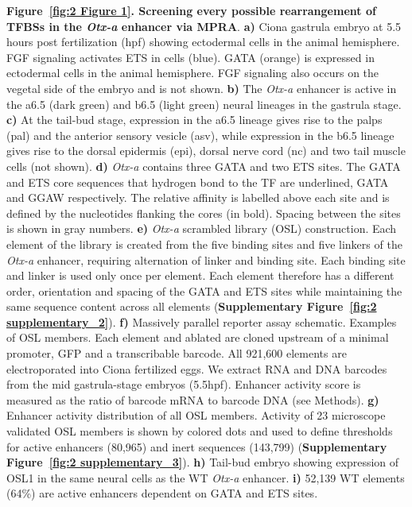 \thispagestyle{plain}
\noindent
\textbf{Figure~\ref{fig:2 Figure 1}. Screening every possible rearrangement of TFBSs in the \textit{Otx-a} enhancer via MPRA}. \textbf{a)} Ciona gastrula embryo at 5.5 hours post fertilization (hpf) showing ectodermal cells in the animal hemisphere. FGF signaling activates ETS in cells (blue). GATA (orange) is expressed in ectodermal cells in the animal hemisphere. FGF signaling also occurs on the vegetal side of the embryo and is not shown. \textbf{b)} The \textit{Otx-a} enhancer is active in the a6.5 (dark green) and b6.5 (light green) neural lineages in the gastrula stage. \textbf{c)} At the tail-bud stage, expression in the a6.5 lineage gives rise to the palps (pal) and the anterior sensory vesicle (asv), while expression in the b6.5 lineage gives rise to the dorsal epidermis (epi), dorsal nerve cord (nc) and two tail muscle cells (not shown). \textbf{d)} \textit{Otx-a} contains three GATA and two ETS sites. The GATA and ETS core sequences that hydrogen bond to the TF are underlined, GATA and GGAW respectively. The relative affinity is labelled above each site and is defined by the nucleotides flanking the cores (in bold). Spacing between the sites is shown in gray numbers. \textbf{e)} \textit{Otx-a} scrambled library (OSL) construction. Each element of the library is created from the five binding sites and five linkers of the \textit{Otx-a} enhancer, requiring alternation of linker and binding site. Each binding site and linker is used only once per element. Each element therefore has a different order, orientation and spacing of the GATA and ETS sites while maintaining the same sequence content across all elements (\textbf{Supplementary Figure~\ref{fig:2 supplementary_2}}). \textbf{f)} Massively parallel reporter assay schematic. Examples of OSL members. Each element and ablated are cloned upstream of a minimal promoter, GFP and a transcribable barcode. All 921,600 elements are electroporated into Ciona fertilized eggs. We extract RNA and DNA barcodes from the mid gastrula-stage embryos (5.5hpf). Enhancer activity score is measured as the ratio of barcode mRNA to barcode DNA (see Methods). \textbf{g)} Enhancer activity distribution of all OSL members. Activity of 23 microscope validated OSL members is shown by colored dots and used to define thresholds for active enhancers (80,965) and inert sequences (143,799) (\textbf{Supplementary Figure~\ref{fig:2 supplementary_3}}). \textbf{h)} Tail-bud embryo showing expression of OSL1 in the same neural cells as the WT \textit{Otx-a} enhancer. \textbf{i)} 52,139 WT elements (64\%) are active enhancers dependent on GATA and ETS sites.


